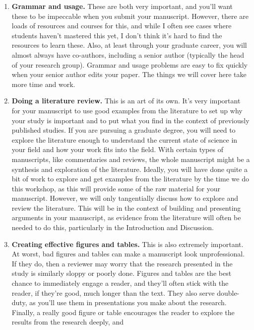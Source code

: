 \documentclass[]{tufte-book}
\providecommand{\tightlist}{%
  \setlength{\itemsep}{0pt}\setlength{\parskip}{0pt}}
\begin{document}
\begin{enumerate}
\def\labelenumi{\arabic{enumi}.}
\tightlist
\item
  \textbf{Grammar and usage.} These are both very important, and you'll want these
  to be impeccable when you submit your manuscript. However, there are loads of
  resources and courses for this, and while I often see cases where students
  haven't mastered this yet, I don't think it's hard to find the resources to
  learn these. Also, at least through your graduate career, you will almost always
  have co-authors, including a senior author (typically the head of your research
  group). Grammar and usage problems are easy to fix quickly when your senior author
  edits your paper. The things we will cover here take more time and work.
\item
  \textbf{Doing a literature review.} This is an art of its own. It's very important
  for your manuscript to use good examples from the literature to set up why your
  study is important and to put what you find in the context of previously
  published studies. If you are pursuing a graduate degree, you will need to
  explore the literature enough to understand the current state of science in your
  field and how your work fits into the field. With certain types of manuscripts,
  like commentaries and reviews, the whole manuscript might be a synthesis and
  exploration of the literature. Ideally, you will have done quite a bit of
  work to explore and get examples from the literature by the time we do this
  workshop, as this will provide some of the raw material for your manuscript.
  However, we will only tangentially discuss how to explore and review the literature.
  This will be in the context of building and presenting arguments in your manuscript,
  as evidence from the literature will often be needed to do this, particularly in the
  Introduction and Discussion.
\item
  \textbf{Creating effective figures and tables.} This is also extremely important.
  At worst, bad figures and tables can make a manuscript look unprofessional. If
  they do, then a reviewer may worry that the research presented in the study is
  similarly sloppy or poorly done. Figures and tables are the best chance to immediately
  engage a reader, and they'll often stick with the reader, if they're good, much
  longer than the text. They also serve double-duty, as you'll use
  them in presentations you make about the research. Finally, a really good figure or
  table encourages the reader to explore the results from the research deeply, and

\end{enumerate}
\end{document}
